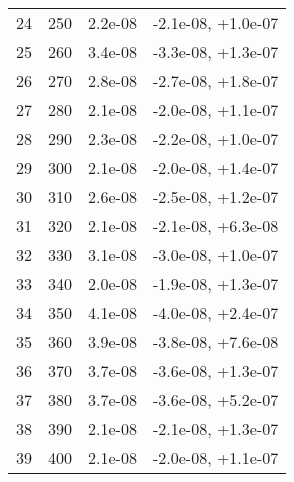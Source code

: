 \begin{table}
\begin{adjustbox}{width=1\textwidth/2}
\begin{tabular}{|c|c|c|c|}
\cline{1-4}
24 & 250 & 2.2e-08 & -2.1e-08, +1.0e-07 \\
\cline{1-4}
25 & 260 & 3.4e-08 & -3.3e-08, +1.3e-07 \\
\cline{1-4}
26 & 270 & 2.8e-08 & -2.7e-08, +1.8e-07 \\
\cline{1-4}
27 & 280 & 2.1e-08 & -2.0e-08, +1.1e-07 \\
\cline{1-4}
28 & 290 & 2.3e-08 & -2.2e-08, +1.0e-07 \\
\cline{1-4}
29 & 300 & 2.1e-08 & -2.0e-08, +1.4e-07 \\
\cline{1-4}
30 & 310 & 2.6e-08 & -2.5e-08, +1.2e-07 \\
\cline{1-4}
31 & 320 & 2.1e-08 & -2.1e-08, +6.3e-08 \\
\cline{1-4}
32 & 330 & 3.1e-08 & -3.0e-08, +1.0e-07 \\
\cline{1-4}
33 & 340 & 2.0e-08 & -1.9e-08, +1.3e-07 \\
\cline{1-4}
34 & 350 & 4.1e-08 & -4.0e-08, +2.4e-07 \\
\cline{1-4}
35 & 360 & 3.9e-08 & -3.8e-08, +7.6e-08 \\
\cline{1-4}
36 & 370 & 3.7e-08 & -3.6e-08, +1.3e-07 \\
\cline{1-4}
37 & 380 & 3.7e-08 & -3.6e-08, +5.2e-07 \\
\cline{1-4}
38 & 390 & 2.1e-08 & -2.1e-08, +1.3e-07 \\
\cline{1-4}
39 & 400 & 2.1e-08 & -2.0e-08, +1.1e-07 \\
\cline{1-4}
\end{tabular}
\end{adjustbox}
\end{table}

